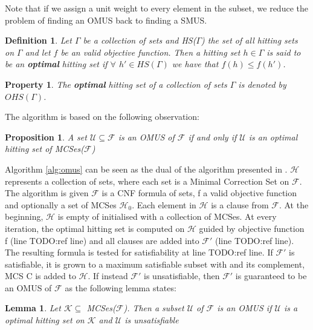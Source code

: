 \documentclass{article}
\newcommand\m[1]{\mathcal{#1}}
\newtheorem{definition}[thm]{Definition}
\newtheorem{property}[prop]{Property}
\newtheorem{lemma}[lem]{Lemma}
\newtheorem{proposition}[propo]{Proposition}
\newcommand\comment[1]{\marginpar{\tiny #1}}
\renewcommand\comment[1]{#1}
\newcommand{\todo}[1]{{\comment{\color{red}\textsc{TODO:}#1}}}
\begin{document}
Note that if we assign a unit weight to every element in the subset, we reduce the problem of finding an OMUS back to finding a SMUS.

\begin{definition}
  Let $\Gamma$ be a collection of sets and HS($\Gamma$) the set of all hitting sets on $\Gamma$ and let $f$ be an valid objective function. Then a hitting set $ h \in \Gamma$ is said to be an \textbf{optimal} hitting set if $\forall$ $h' \in HS(\Gamma)$ we have that %
  $f(h) \leq f(h')$. %
\end{definition}

\begin{property}
  The \textbf{optimal} hitting set of a collection of sets $\Gamma$ is denoted by $OHS(\Gamma)$.
\end{property}

The algorithm is based on the following observation:

\begin{proposition}\label{prop:optimal-hitting-set}
  A set $\m{U} \subseteq \m{F}$ is an OMUS of $\m{F}$ if and only if $\m{U}$ is an optimal hitting set of MCSes($\m{F}$)
\end{proposition}

Algorithm \ref{alg:omus} can be seen as the dual of the algorithm presented in \cite{davies2011solving}. $\m{H}$ represents a collection of sets, where each set is a Minimal Correction Set on $\m{F}$. The algorithm is given $\m{F}$ is a CNF formula of sets, f a valid objective function and optionally a set of MCSes $\m{H}_0$.
Each element in $\m{H}$ is a clause from $\m{F}$. At the beginning,  $\m{H}$ is empty of initialised with a collection of MCSes. 
At every iteration, the optimal hitting set is computed on $\m{H}$ guided by objective function f (line \todo{ref line}) and all clauses are added into $\m{F}'$  (line \todo{ref line}). 
The resulting formula is tested for satisfiability at line \todo{ref line}. 
If $\m{F}'$ is satisfiable, it is grown to a maximum satisfiable subset with and its complement, MCS C is added to $\m{H}$.
If instead $\m{F}'$ is unsatisfiable, then $\m{F}'$ is guaranteed to be an OMUS of $\m{F}$ as the following lemma states:

\begin{lemma}\label{lemma:K}
  Let $\m{K}  \subseteq$ MCSes($\m{F}$). Then a subset $\m{U}$ of $\m{F}$ is an OMUS if $\m{U}$ is a optimal hitting set on $\m{K}$ and $\m{U}$ is unsatisfiable
\end{lemma}
\end{document}
